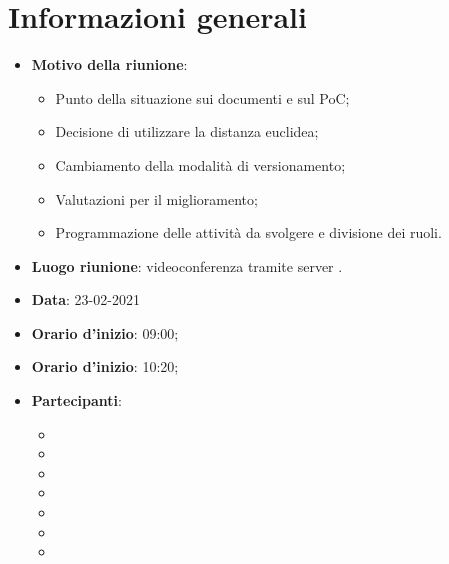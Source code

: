 \section{Informazioni generali}
\begin{itemize}
\item \textbf{Motivo della riunione}: 
\begin{itemize}
\item Punto della situazione sui documenti e sul PoC;
\item Decisione di utilizzare la distanza euclidea;
\item Cambiamento della modalità di versionamento;
\item Valutazioni per il miglioramento;
\item Programmazione delle attività da svolgere e divisione dei ruoli.
\end{itemize}
\item \textbf{Luogo riunione}: videoconferenza tramite server .
\item \textbf{Data}: 23-02-2021
\item \textbf{Orario d'inizio}: 09:00;
\item \textbf{Orario d'inizio}: 10:20;
\item \textbf{Partecipanti}:
	\begin{itemize}
	\item \BM{}
	\item \SG{}
	\item \SP{}
	\item \SH{}
	\item \PA{}
	\item \ZM{}
	\item \RA{}
	\end{itemize}
\end{itemize}

\newpage
